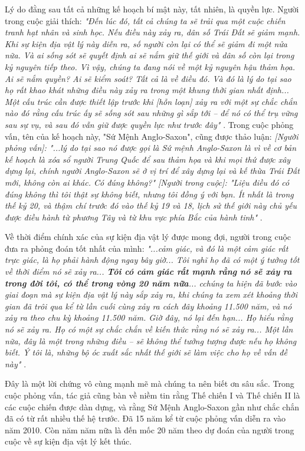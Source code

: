 Lý do đằng sau tất cả những kế hoạch bí mật này, tất nhiên, là quyền lực. Người trong cuộc giải thích: \textit{"Đến lúc đó, tất cả chúng ta sẽ trải qua một cuộc chiến tranh hạt nhân và sinh học. Nếu điều này xảy ra, dân số Trái Đất sẽ giảm mạnh. Khi sự kiện địa vật lý này diễn ra, số người còn lại có thể sẽ giảm đi một nửa nữa. Và ai sống sót sẽ quyết định ai sẽ nắm giữ thế giới và dân số còn lại trong kỷ nguyên tiếp theo. Vì vậy, chúng ta đang nói về một kỷ nguyên hậu thảm họa. Ai sẽ nắm quyền? Ai sẽ kiểm soát? Tất cả là về điều đó. Và đó là lý do tại sao họ rất khao khát những điều này xảy ra trong một khung thời gian nhất định... Một cấu trúc cần được thiết lập trước khi [hỗn loạn] xảy ra với một sự chắc chắn nào đó rằng cấu trúc ấy sẽ sống sót sau những gì sắp tới -- để nó có thể trụ vững sau sự vụ, và sau đó vẫn giữ được quyền lực như trước đây"} \cite{4}. Trong cuộc phỏng vấn, tên của kế hoạch này, "Sứ Mệnh Anglo-Saxon", cũng được thảo luận: \textit{[Người phỏng vấn]: "...lý do tại sao nó được gọi là Sứ mệnh Anglo-Saxon là vì về cơ bản kế hoạch là xóa sổ người Trung Quốc để sau thảm họa và khi mọi thứ được xây dựng lại, chính người Anglo-Saxon sẽ ở vị trí để xây dựng lại và kế thừa Trái Đất mới, không còn ai khác. Có đúng không?" [Người trong cuộc]: "Liệu điều đó có đúng không thì tôi thật sự không biết, nhưng tôi đồng ý với bạn.  Ít nhất là trong thế kỷ 20, và thậm chí trước đó vào thế kỷ 19 và 18, lịch sử thế giới này chủ yếu được điều hành từ phương Tây và từ khu vực phía Bắc của hành tinh"} \cite{4}.

Về thời điểm chính xác của sự kiện địa vật lý được mong đợi, người trong cuộc đưa ra phỏng đoán tốt nhất của mình: \textit{"...cảm giác, và đó là một cảm giác rất trực giác, là họ phải hành động ngay bây giờ... Tôi nghĩ họ đã có một ý tưởng tốt về thời điểm nó sẽ xảy ra... \textbf{Tôi có cảm giác rất mạnh rằng nó sẽ xảy ra trong đời tôi, có thể trong vòng 20 năm nữa}... cchúng ta hiện đã bước vào giai đoạn mà sự kiện địa vật lý này sắp xảy ra, khi chúng ta xem xét khoảng thời gian đã trôi qua kể từ lần cuối cùng xảy ra cách đây khoảng 11.500 năm, và nó xảy ra theo chu kỳ khoảng 11.500 năm. Giờ đây, nó lại đến hạn... Họ hiểu rằng nó sẽ xảy ra. Họ có một sự chắc chắn về kiến thức rằng nó sẽ xảy ra... Một lần nữa, đây là một trong những điều -- sẽ không thể tưởng tượng được nếu họ không biết. Ý tôi là, những bộ óc xuất sắc nhất thế giới sẽ làm việc cho họ về vấn đề này"} \cite{4}.

Đây là một lời chứng vô cùng mạnh mẽ mà chúng ta nên biết ơn sâu sắc. Trong cuộc phỏng vấn, tác giả cũng bàn về niềm tin rằng Thế chiến I và Thế chiến II là các cuộc chiến được dàn dựng, và rằng Sứ Mệnh Anglo-Saxon gần như chắc chắn đã có từ rất nhiều thế hệ trước. Đã 15 năm kể từ cuộc phỏng vấn diễn ra vào năm 2010. Còn năm năm nữa là đến mốc 20 năm theo dự đoán của người trong cuộc về sự kiện địa vật lý kết thúc.

